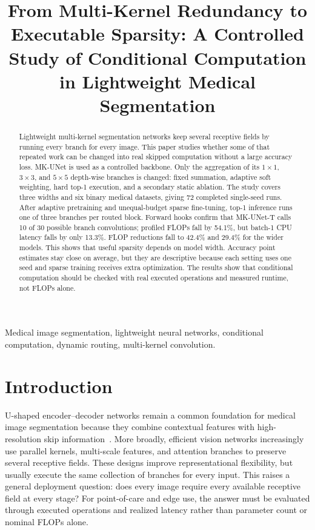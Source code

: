 \documentclass[conference]{IEEEtran}
\title{From Multi-Kernel Redundancy to Executable Sparsity: A Controlled Study of Conditional Computation in Lightweight Medical Segmentation}
\author{\IEEEauthorblockN{M Mohaiminul Islam}
\IEEEauthorblockA{Department of Computer Science and Telecommunication Engineering\\
Noakhali Science and Technology University}}
\begin{document}
\maketitle

\begin{abstract}
Lightweight multi-kernel segmentation networks keep several receptive fields by running every branch for every image. This paper studies whether some of that repeated work can be changed into real skipped computation without a large accuracy loss. MK-UNet is used as a controlled backbone. Only the aggregation of its $1\times1$, $3\times3$, and $5\times5$ depth-wise branches is changed: fixed summation, adaptive soft weighting, hard top-1 execution, and a secondary static ablation. The study covers three widths and six binary medical datasets, giving 72 completed single-seed runs. After adaptive pretraining and unequal-budget sparse fine-tuning, top-1 inference runs one of three branches per routed block. Forward hooks confirm that MK-UNet-T calls 10 of 30 possible branch convolutions; profiled FLOPs fall by 54.1\%, but batch-1 CPU latency falls by only 13.3\%. FLOP reductions fall to 42.4\% and 29.4\% for the wider models. This shows that useful sparsity depends on model width. Accuracy point estimates stay close on average, but they are descriptive because each setting uses one seed and sparse training receives extra optimization. The results show that conditional computation should be checked with real executed operations and measured runtime, not FLOPs alone.
\end{abstract}

\begin{IEEEkeywords}
Medical image segmentation, lightweight neural networks, conditional computation, dynamic routing, multi-kernel convolution.
\end{IEEEkeywords}

\section{Introduction}
U-shaped encoder--decoder networks remain a common foundation for medical image segmentation because they combine contextual features with high-resolution skip information~\cite{ronneberger2015unet}. More broadly, efficient vision networks increasingly use parallel kernels, multi-scale features, and attention branches to preserve several receptive fields. These designs improve representational flexibility, but usually execute the same collection of branches for every input. This raises a general deployment question: does every image require every available receptive field at every stage? For point-of-care and edge use, the answer must be evaluated through executed operations and realized latency rather than parameter count or nominal FLOPs alone.
\end{document}
